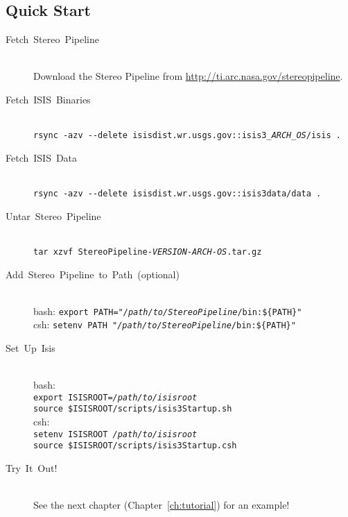 \subsection{Quick Start}
\begin{description}

\item[{Fetch~Stereo~Pipeline}] ~\\
Download the Stereo Pipeline from \url{http://ti.arc.nasa.gov/stereopipeline}.

\item [{Fetch~ISIS~Binaries}] ~\\
\texttt{rsync -azv -\/-delete isisdist.wr.usgs.gov::isis3\_\textit{ARCH\_OS}/isis .}

\item [{Fetch~ISIS~Data}] ~\\
\verb#rsync -azv --delete isisdist.wr.usgs.gov::isis3data/data .#

\item [{Untar~Stereo~Pipeline}] ~\\
\texttt{tar xzvf StereoPipeline-\textit{VERSION-ARCH-OS}.tar.gz}

\item [{Add~Stereo~Pipeline~to~Path~(optional)}] ~\\
bash: \texttt{export PATH="\textit{/path/to/StereoPipeline}/bin:\$\{PATH\}"} \\
csh:  \texttt{setenv PATH "\textit{/path/to/StereoPipeline}/bin:\$\{PATH\}"}

\pagebreak
\item[Set~Up~Isis] ~\\
bash: \\
\hspace*{2em}\texttt{export ISISROOT=\textit{/path/to/isisroot}} \\
\hspace*{2em}\texttt{source \$ISISROOT/scripts/isis3Startup.sh} \\
csh: \\
\hspace*{2em}\texttt{setenv ISISROOT \textit{/path/to/isisroot}} \\
\hspace*{2em}\texttt{source \$ISISROOT/scripts/isis3Startup.csh}

\item [{Try~It~Out!}] ~\\
See the next chapter (Chapter~\ref{ch:tutorial}) for an example!
\end{description}

